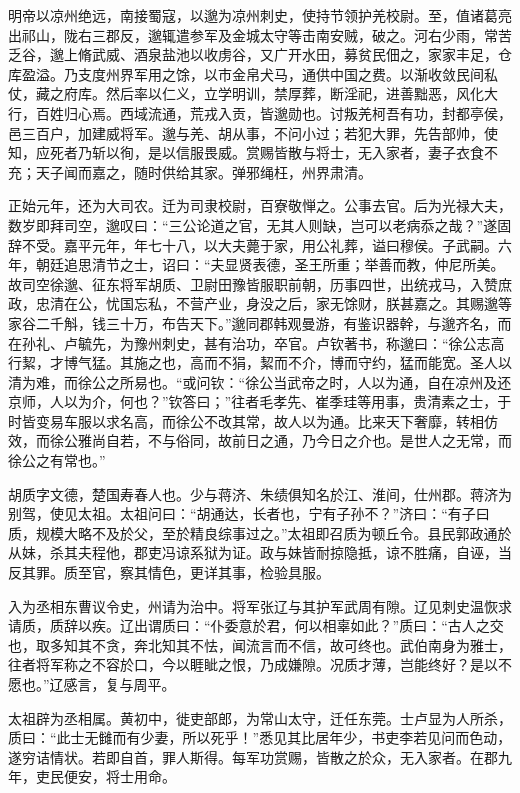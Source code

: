 \documentclass[12pt,UTF8]{ctexbook}
\begin{document}
明帝以凉州绝远，南接蜀寇，以邈为凉州刺史，使持节领护羌校尉。至，值诸葛亮出祁山，陇右三郡反，邈辄遣参军及金城太守等击南安贼，破之。河右少雨，常苦乏谷，邈上脩武威、酒泉盐池以收虏谷，又广开水田，募贫民佃之，家家丰足，仓库盈溢。乃支度州界军用之馀，以市金帛犬马，通供中国之费。以渐收敛民间私仗，藏之府库。然后率以仁义，立学明训，禁厚葬，断淫祀，进善黜恶，风化大行，百姓归心焉。西域流通，荒戎入贡，皆邈勋也。讨叛羌柯吾有功，封都亭侯，邑三百户，加建威将军。邈与羌、胡从事，不问小过；若犯大罪，先告部帅，使知，应死者乃斩以徇，是以信服畏威。赏赐皆散与将士，无入家者，妻子衣食不充；天子闻而嘉之，随时供给其家。弹邪绳枉，州界肃清。

正始元年，还为大司农。迁为司隶校尉，百寮敬惮之。公事去官。后为光禄大夫，数岁即拜司空，邈叹曰：“三公论道之官，无其人则缺，岂可以老病忝之哉？”遂固辞不受。嘉平元年，年七十八，以大夫薨于家，用公礼葬，谥曰穆侯。子武嗣。六年，朝廷追思清节之士，诏曰：“夫显贤表德，圣王所重；举善而教，仲尼所美。故司空徐邈、征东将军胡质、卫尉田豫皆服职前朝，历事四世，出统戎马，入赞庶政，忠清在公，忧国忘私，不营产业，身没之后，家无馀财，朕甚嘉之。其赐邈等家谷二千斛，钱三十万，布告天下。”邈同郡韩观曼游，有鉴识器幹，与邈齐名，而在孙礼、卢毓先，为豫州刺史，甚有治功，卒官。卢钦著书，称邈曰：“徐公志高行絜，才博气猛。其施之也，高而不狷，絜而不介，博而守约，猛而能宽。圣人以清为难，而徐公之所易也。“或问钦：“徐公当武帝之时，人以为通，自在凉州及还京师，人以为介，何也？”钦答曰；”往者毛孝先、崔季珪等用事，贵清素之士，于时皆变易车服以求名高，而徐公不改其常，故人以为通。比来天下奢靡，转相仿效，而徐公雅尚自若，不与俗同，故前日之通，乃今日之介也。是世人之无常，而徐公之有常也。”

胡质字文德，楚国寿春人也。少与蒋济、朱绩俱知名於江、淮间，仕州郡。蒋济为别驾，使见太祖。太祖问曰：“胡通达，长者也，宁有子孙不？”济曰：“有子曰质，规模大略不及於父，至於精良综事过之。”太祖即召质为顿丘令。县民郭政通於从妹，杀其夫程他，郡吏冯谅系狱为证。政与妹皆耐掠隐抵，谅不胜痛，自诬，当反其罪。质至官，察其情色，更详其事，检验具服。

入为丞相东曹议令史，州请为治中。将军张辽与其护军武周有隙。辽见刺史温恢求请质，质辞以疾。辽出谓质曰：“仆委意於君，何以相辜如此？”质曰：“古人之交也，取多知其不贪，奔北知其不怯，闻流言而不信，故可终也。武伯南身为雅士，往者将军称之不容於口，今以睚眦之恨，乃成嫌隙。况质才薄，岂能终好？是以不愿也。”辽感言，复与周平。

太祖辟为丞相属。黄初中，徙吏部郎，为常山太守，迁任东莞。士卢显为人所杀，质曰：“此士无雠而有少妻，所以死乎！”悉见其比居年少，书吏李若见问而色动，遂穷诘情状。若即自首，罪人斯得。每军功赏赐，皆散之於众，无入家者。在郡九年，吏民便安，将士用命。
\end{document}
